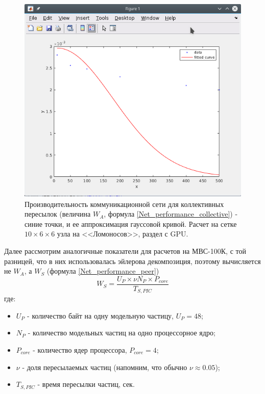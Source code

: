 \begin{figure}[h]
	
	
	\begin{center}
		\includegraphics[height=10cm,keepaspectratio]{images/W_A_Lomonosov_Gauss.png}
		\caption{
				Производительность коммуникационной сети для коллективных пересылок (величина $W_A$, формула \ref{Net_performance_collective}) - синие точки, и ее аппроксимация гауссовой кривой. Расчет на сетке $10 \times 6 \times 6$ узла на <<Ломоносов>>, раздел с GPU. 
		}
		\label{scale_W_A_Lomonosov}
	\end{center} 
\end{figure}


Далее рассмотрим аналогичные показатели для расчетов на МВС-100К, с той разницей, что в них использовалась эйлерова декомпозиция, поэтому вычисляется не $W_A$, а $W_S$ (формула \ref{Net_performance_peer})
$$
W_S = \frac{U_P\times \nu N_P \times P_{core}}{T_{S,PIC}}
$$
где:
\begin{itemize}
	\item $U_P$ - количество байт на одну модельную частицу, $U_P = 48$;
	\item $N_P$ - количество модельных частиц на одно процессорное ядро;  
	\item $P_{core}$ - количество ядер процессора, $P_{core} = 4$;
	\item $\nu$ - доля пересылаемых частиц (напомним, что обычно $\nu \approx 0.05$);
	\item $T_{S,PIC}$  - время пересылки частиц, сек.
\end{itemize}

